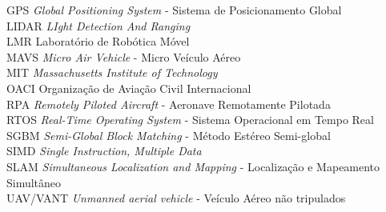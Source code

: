 \begin{tabbing}
\> GPS 	 	\> \textit{Global Positioning System} - Sistema de Posicionamento Global						\\
\> LIDAR 	\> \textit{LIght Detection And Ranging}											\\
\> LMR 	 	\> Laboratório de Robótica Móvel											\\
\> MAVS  	\> \textit{Micro Air Vehicle} - Micro Veículo Aéreo									\\
\> MIT 	 	\> \textit{Massachusetts Institute of Technology}									\\
\> OACI  	\> Organização de Aviação Civil Internacional 										\\
\> RPA 	 	\> \textit{Remotely Piloted Aircraft} - Aeronave Remotamente Pilotada							\\
\> RTOS	 	\> \textit{Real-Time Operating System} - Sistema Operacional em Tempo Real						\\
\> SGBM  	\> \textit{Semi-Global Block Matching} - Método Estéreo Semi-global							\\
\> SIMD  	\> \textit{Single Instruction, Multiple Data}										\\
\> SLAM  	\> \textit{Simultaneous Localization and Mapping} - Localização e Mapeamento Simultâneo					\\
\> UAV/VANT 	\> \textit{Unmanned aerial vehicle} - Veículo Aéreo não tripulados 							\\

\end{tabbing}
\cleardoublepage
\pagestyle{fancy}
\fancyhf{} %
\fancyhead[RO, LE] {\thepage}


\tableofcontents %
